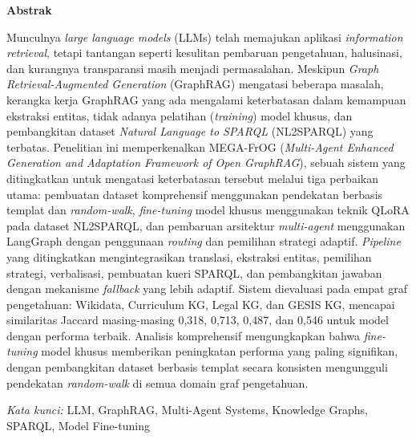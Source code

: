 \documentclass[12pt,a4paper,onecolumn]{article}
\def\judulInggris{MEGA-FrOG: Multi-Agent Enhanced Generation and Adaptation Framework of Open GraphRAG}
\begin{document}
\vspace*{2\baselineskip}
\vspace{12pt}
{\begin{center}\textbf{\fontsize{12}{14}\selectfont Abstrak}\end{center}}
\vspace{12pt}
{\fontsize{10}{12}\selectfont\singlespacing
Munculnya \textit{large language models} (LLMs) telah memajukan aplikasi \textit{information retrieval}, tetapi tantangan seperti kesulitan pembaruan pengetahuan, halusinasi, dan kurangnya transparansi masih menjadi permasalahan. Meskipun \textit{Graph Retrieval-Augmented Generation} (GraphRAG) mengatasi beberapa masalah, kerangka kerja GraphRAG yang ada mengalami keterbatasan dalam kemampuan ekstraksi entitas, tidak adanya pelatihan (\textit{training}) model khusus, dan pembangkitan dataset \textit{Natural Language to SPARQL} (NL2SPARQL) yang terbatas. Penelitian ini memperkenalkan MEGA-FrOG (\textit{Multi-Agent Enhanced Generation and Adaptation Framework of Open GraphRAG}), sebuah sistem yang ditingkatkan untuk mengatasi keterbatasan tersebut melalui tiga perbaikan utama: pembuatan dataset komprehensif menggunakan pendekatan berbasis templat dan \textit{random-walk}, \textit{fine-tuning} model khusus menggunakan teknik QLoRA pada dataset NL2SPARQL, dan pembaruan arsitektur \textit{multi-agent} menggunakan LangGraph dengan penggunaan \textit{routing} dan pemilihan strategi adaptif. \textit{Pipeline} yang ditingkatkan mengintegrasikan translasi, ekstraksi entitas, pemilihan strategi, verbalisasi, pembuatan kueri SPARQL, dan pembangkitan jawaban dengan mekanisme \textit{fallback} yang lebih adaptif. Sistem dievaluasi pada empat graf pengetahuan: Wikidata, Curriculum KG, Legal KG, dan GESIS KG, mencapai similaritas Jaccard masing-masing 0,318, 0,713, 0,487, dan 0,546 untuk model dengan performa terbaik. Analisis komprehensif mengungkapkan bahwa \textit{fine-tuning} model khusus memberikan peningkatan performa yang paling signifikan, dengan pembangkitan dataset berbasis templat secara konsisten mengungguli pendekatan \textit{random-walk} di semua domain graf pengetahuan.\par}

{\fontsize{10}{12}\selectfont\singlespacing\textit{Kata kunci:} LLM, GraphRAG, Multi-Agent Systems, Knowledge Graphs, SPARQL, Model Fine-tuning \par}
\end{document}
